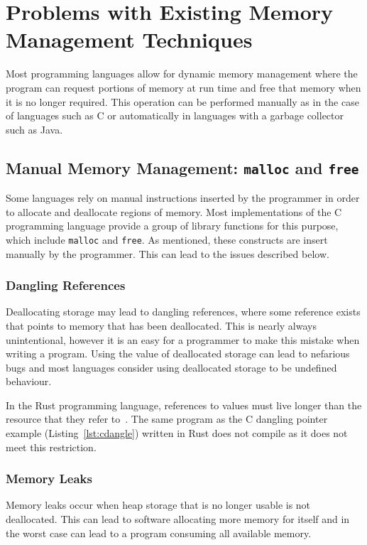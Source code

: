 \section{Problems with Existing Memory Management Techniques}
Most programming languages allow for dynamic memory management where the
program can request portions of memory at run time and free that memory when it
is no longer required. This operation can be performed manually as in the case
of languages such as C or automatically in languages with a garbage collector
such as Java.

\subsection{Manual Memory Management: \lstinline{malloc} and \lstinline{free}}
Some languages rely on manual instructions inserted by the programmer in order
to allocate and deallocate regions of memory. Most implementations of the C
programming language provide a group of library functions for this purpose,
which include \lstinline{malloc} and \lstinline{free}. As mentioned, these
constructs are insert manually by the programmer. This can lead to the issues
described below.

\subsubsection{Dangling References}\label{sec:dangle}
Deallocating storage may lead to dangling references, where some reference 
exists that points to memory that has been deallocated. This is nearly always
unintentional, however it is an easy for a programmer to make this mistake when
writing a program. Using the value of deallocated storage can lead to nefarious
bugs and most languages consider using deallocated storage to
be undefined behaviour.



In the Rust programming language, references to values must live longer than
the resource that they refer to~\cite{rust-borrowing}. The same program as the 
C dangling pointer example (Listing~\ref{lst:cdangle}) written in Rust does not
compile as it does not meet this restriction.



\subsubsection{Memory Leaks}\label{sec:leak}
Memory leaks occur when heap storage that is no longer usable is not
deallocated. This can lead to software allocating more memory for itself and in
the worst case can lead to a program consuming all available memory.

